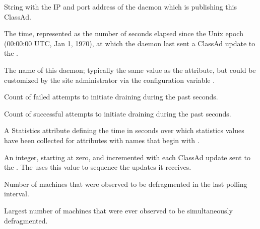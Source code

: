 \begin{description}
\item[\AdAttr{MyAddress}:] String with the IP and port address of the
 daemon which is publishing this ClassAd.

\item[\AdAttr{MyCurrentTime}:]  The time, represented as the number of 
  seconds elapsed since the Unix epoch (00:00:00 UTC, Jan 1, 1970),
  at which the  daemon last sent a ClassAd update to the
  .

\item[\AdAttr{Name}:] The name of this daemon; typically the same value as
  the  attribute, but could be customized by the site
  administrator via the configuration variable .

\item[\AdAttr{RecentDrainFailures}:] Count of failed attempts
  to initiate draining during the past  seconds.

\item[\AdAttr{RecentDrainSuccesses}:] Count of successful attempts
  to initiate draining during the past  seconds.

\item[\AdAttr{RecentStatsLifetime}:] A Statistics attribute defining 
  the time in seconds over which statistics values have been collected 
  for attributes with names that begin with . 

\item[\AdAttr{UpdateSequenceNumber}:] An integer, starting at zero,
  and incremented with each ClassAd update sent to the .
  The  uses this value to sequence the updates it
  receives.

\item[\AdAttr{WholeMachines}:] Number of machines that were observed
  to be defragmented in the last polling interval.

\item[\AdAttr{WholeMachinesPeak}:] Largest number of machines that were
  ever observed to be simultaneously defragmented.

\end{description}

